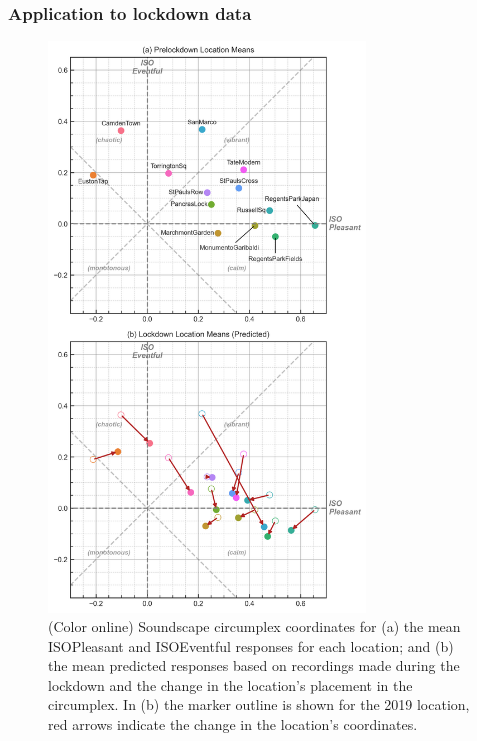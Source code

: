 \documentclass[
  authoryear,
  preprint,
  3p,
  onecolumn]{elsarticle}
\begin{document}
\hypertarget{sec-application}{%
\subsubsection{Application to lockdown data}\label{sec-application}}

\begin{figure}

{\centering \includegraphics[width=0.75\textwidth,height=\textheight]{Figure5.jpg}

}

\caption{\label{fig-locations}(Color online) Soundscape circumplex
coordinates for (a) the mean ISOPleasant and ISOEventful responses for
each location; and (b) the mean predicted responses based on recordings
made during the lockdown and the change in the location's placement in
the circumplex. In (b) the marker outline is shown for the 2019
location, red arrows indicate the change in the location's coordinates.}

\end{figure}
\end{document}
